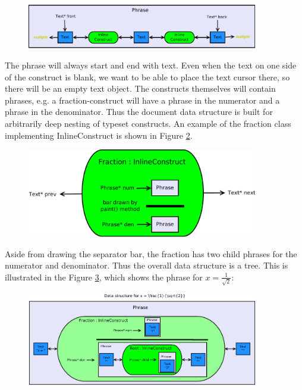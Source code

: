 \documentclass[12pt]{article}
\begin{document}
\begin{figure}[ht]
	\centering
		\includegraphics[width=0.90\textwidth]{Fig/Phrase.pdf}
	\caption{}
	\label{fig:phrase}
\end{figure}
The phrase will always start and end with text. Even when the text on one side of the construct is blank, we want to be able to place the text cursor there, so there will be an empty text object.
The constructs themselves will contain phrases, e.g. a fraction-construct will have a phrase in the numerator and a phrase in the denominator. Thus the document data structure is built for arbitrarily deep nesting of typeset constructs. An example of the fraction class implementing InlineConstruct is shown in Figure \ref{fig:fraction}.

\begin{figure}[ht]
	\centering
		\includegraphics[width=0.90\textwidth]{Fig/Fraction.pdf}
	\caption{}
	\label{fig:fraction}
\end{figure}

Aside from drawing the separator bar, the fraction has two child phrases for the numerator and denominator.
Thus the overall data structure is a tree. This is illustrated in the Figure \ref{fig:nested_phrase}, which shows the phrase for $x = \frac{1}{\sqrt{2}}$:

\begin{figure}[ht]
	\centering
		\includegraphics[width=0.90\textwidth]{Fig/NestedPhrase.pdf}
	\caption{}
	\label{fig:nested_phrase}
\end{figure}
\end{document}

